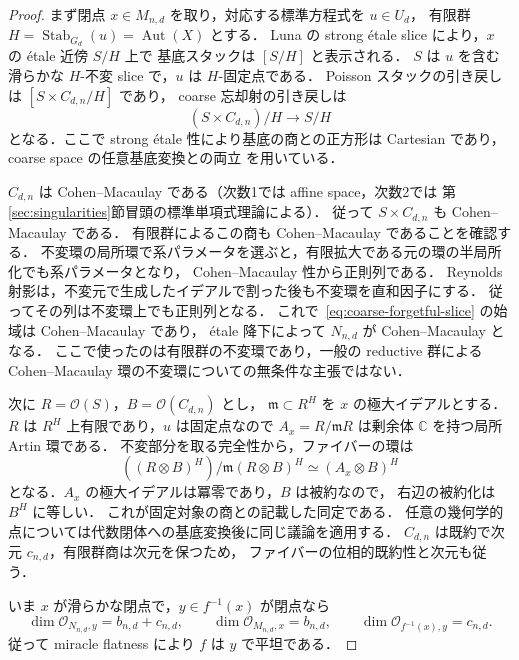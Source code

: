 \begin{proof}
まず閉点 $x\in M_{n,d}$ を取り，対応する標準方程式を $u\in U_d$，
有限群 $H=\operatorname{Stab}_{G_d}(u)=\operatorname{Aut}(X)$ とする．
Luna の strong \'{e}tale slice
\cite[III, \S1]{Luna1973} により，$x$ の \'{e}tale 近傍 $S/H$ 上で
基底スタックは $[S/H]$ と表示される．
$S$ は $u$ を含む滑らかな $H$-不変 slice で，$u$ は $H$-固定点である．
Poisson スタックの引き戻しは $[S\times C_{d,n}/H]$ であり，
coarse 忘却射の引き戻しは
\begin{equation}
 (S\times C_{d,n})/H\longrightarrow S/H
 \label{eq:coarse-forgetful-slice}
\end{equation}
となる．ここで strong \'{e}tale 性により基底の商との正方形は Cartesian であり，
coarse space の任意基底変換との両立
\cite[Corollary~3.3]{AbramovichOlssonVistoli2008} を用いている．

$C_{d,n}$ は Cohen--Macaulay である（次数1では affine space，次数2では
第\ref{sec:singularities}節冒頭の標準単項式理論による）．
従って $S\times C_{d,n}$ も Cohen--Macaulay である．
有限群によるこの商も Cohen--Macaulay であることを確認する．
不変環の局所環で系パラメータを選ぶと，有限拡大である元の環の半局所化でも系パラメータとなり，
Cohen--Macaulay 性から正則列である．
Reynolds 射影は，不変元で生成したイデアルで割った後も不変環を直和因子にする．
従ってその列は不変環上でも正則列となる．
これで~\eqref{eq:coarse-forgetful-slice} の始域は Cohen--Macaulay であり，
\'{e}tale 降下によって $N_{n,d}$ が Cohen--Macaulay となる．
ここで使ったのは有限群の不変環であり，一般の reductive 群による
Cohen--Macaulay 環の不変環についての無条件な主張ではない．

次に $R=\mathcal O(S)$，$B=\mathcal O(C_{d,n})$ とし，
$\mathfrak m\subset R^H$ を $x$ の極大イデアルとする．
$R$ は $R^H$ 上有限であり，$u$ は固定点なので
$A_x=R/\mathfrak m R$ は剰余体 $\mathbb C$ を持つ局所 Artin 環である．
不変部分を取る完全性から，ファイバーの環は
\[
 ((R\otimes B)^H)/\mathfrak m(R\otimes B)^H
 \simeq(A_x\otimes B)^H
\]
となる．$A_x$ の極大イデアルは冪零であり，$B$ は被約なので，
右辺の被約化は $B^H$ に等しい．
これが固定対象の商との記載した同定である．
任意の幾何学的点については代数閉体への基底変換後に同じ議論を適用する．
$C_{d,n}$ は既約で次元 $c_{n,d}$，有限群商は次元を保つため，
ファイバーの位相的既約性と次元も従う．

いま $x$ が滑らかな閉点で，$y\in f^{-1}(x)$ が閉点なら
\[
 \dim\mathcal O_{N_{n,d},y}=b_{n,d}+c_{n,d},\qquad
 \dim\mathcal O_{M_{n,d},x}=b_{n,d},\qquad
 \dim\mathcal O_{f^{-1}(x),y}=c_{n,d}.
\]
従って miracle flatness
\cite[Tag 00R4]{StacksProject} により $f$ は $y$ で平坦である．


\end{proof}
